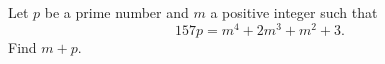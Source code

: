 Let $p$ be a prime number and $m$ a positive integer such that
\[
157p=m^4+2m^3+m^2+3 .
\]
Find $m+p$.
